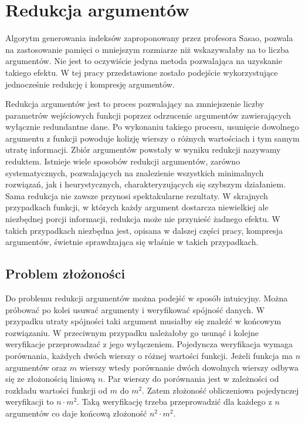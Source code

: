\chapter{Redukcja argumentów}

Algorytm generowania indeksów zaproponowany przez profesora Sasao,
pozwala na zastosowanie pamięci o mniejszym rozmiarze niż wskazywałaby na to liczba argumentów.
Nie jest to oczywiście jedyna metoda pozwalająca na  uzyskanie takiego efektu.
W tej pracy przedstawione zostało podejście wykorzystujące jednocześnie redukcję i kompresję argumentów.

Redukcja argumentów jest to proces pozwalający na zmniejszenie liczby parametrów wejściowych funkcji poprzez odrzucenie argumentów zawierających wyłącznie redundantne dane.
Po wykonaniu takiego procesu,
usunięcie dowolnego argumentu z funkcji powoduje kolizję wierszy o różnych wartościach i tym samym utratę informacji.
Zbiór argumentów powstały w wyniku redukcji nazywamy reduktem.
Istnieje wiele sposobów redukcji argumentów,
zarówno systematycznych,
pozwalających na znalezienie wszystkich minimalnych rozwiązań,
jak i heurystycznych,
charakteryzujących się szybszym działaniem.
Sama redukcja nie zawsze przynosi spektakularne rezultaty.
W skrajnych przypadkach funkcji,
w których każdy argument dostarcza niewielkiej ale niezbędnej porcji informacji,
redukcja może nie przynieść żadnego efektu.
W takich przypadkach niezbędna jest,
opisana w dalszej części pracy,
kompresja argumentów,
świetnie sprawdzająca się właśnie w takich przypadkach.

\section{Problem złożoności}

Do problemu redukcji argumentów można podejść w sposób intuicyjny.
Można próbować po kolei usuwać argumenty i weryfikować spójność danych.
W przypadku utraty spójności taki argument musiałby się znaleźć w końcowym rozwiązaniu.
W przeciwnym przypadku należałoby go usunąć i kolejne weryfikacje przeprowadzać z jego wyłączeniem.
Pojedyncza weryfikacja wymaga porównania,
każdych dwóch wierszy o różnej wartości funkcji.
Jeżeli funkcja ma $n$ argumentów oraz $m$ wierszy wtedy porównanie dwóch dowolnych wierszy odbywa się ze złożonością liniową $n$.
Par wierszy do porównania jest w zależności od rozkładu wartości funkcji od $m$ do $m^2$.
Zatem złożoność obliczeniowa pojedynczej weryfikacji to $n \cdot m^2$.
Taką weryfikację trzeba przeprowadzić dla każdego z $n$ argumentów co daje końcową złożoność $n^2 \cdot m^2$.

